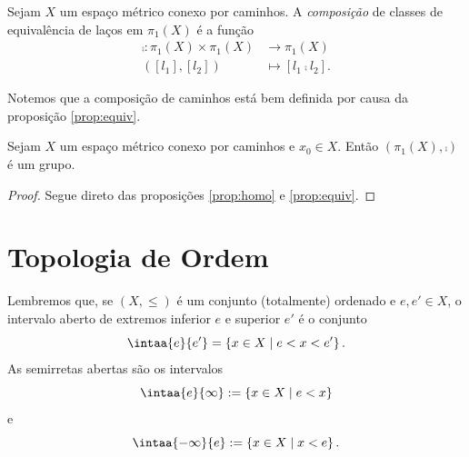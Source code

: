 \begin{defi}
	Sejam $X$ um espaço métrico conexo por caminhos. A \emph{composição} de classes de equivalência de laços em $\pi_1(X)$ é a função
	\begin{align*}
	\comp : \pi_1(X) \times \pi_1(X) &\to \pi_1(X) \\
				([l_1],[l_2]) &\mapsto [l_1 \comp l_2].
	\end{align*}
\end{defi}

Notemos que a composição de caminhos está bem definida por causa da proposição \ref{prop:equiv}.

\begin{teo}
	Sejam $X$ um espaço métrico conexo por caminhos e $x_0 \in X$. Então  $(\pi_1(X),\comp)$ é um grupo.	
\end{teo}
\begin{proof}
	Segue direto das proposições  \ref{prop:homo} e \ref{prop:equiv}.
\end{proof}






























\cleardoublepage

\section{Topologia de Ordem}

Lembremos que, se $(X,\leq)$ é um conjunto (totalmente) ordenado e $e,e' \in X$, o intervalo aberto de extremos inferior $e$ e superior $e'$ é o conjunto
	\begin{equation*}
	\intaa{e}{e'}= \set{x \in X}{e < x < e'}.
	\end{equation*}
As semirretas abertas são os intervalos
	\begin{equation*}
	\intaa{e}{\infty} := \set{x \in X}{e < x}
	\end{equation*}
e
	\begin{equation*}
	\intaa{-\infty}{e} := \set{x \in X}{x < e}.
	\end{equation*}

